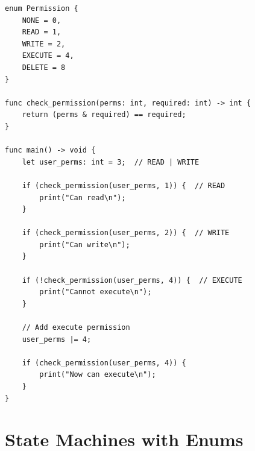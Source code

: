 \documentclass[12pt,a4paper,oneside]{book}
\begin{document}
\begin{lstlisting}[style=algo, caption={Using Enums as Bit Flags}]
enum Permission {
    NONE = 0,
    READ = 1,
    WRITE = 2,
    EXECUTE = 4,
    DELETE = 8
}

func check_permission(perms: int, required: int) -> int {
    return (perms & required) == required;
}

func main() -> void {
    let user_perms: int = 3;  // READ | WRITE
    
    if (check_permission(user_perms, 1)) {  // READ
        print("Can read\n");
    }
    
    if (check_permission(user_perms, 2)) {  // WRITE
        print("Can write\n");
    }
    
    if (!check_permission(user_perms, 4)) {  // EXECUTE
        print("Cannot execute\n");
    }
    
    // Add execute permission
    user_perms |= 4;
    
    if (check_permission(user_perms, 4)) {
        print("Now can execute\n");
    }
}
\end{lstlisting}

\section{State Machines with Enums}
\end{document}
